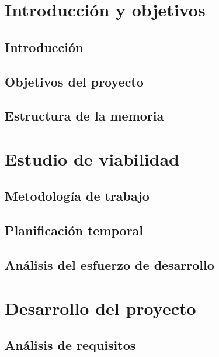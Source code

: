 
\part{Introducción y objetivos}

\chapter{Introducción}

\chapter{Objetivos del proyecto}

\chapter{Estructura de la memoria}

\part{Estudio de viabilidad}

\chapter{Metodología de trabajo}

\chapter{Planificación temporal}

\chapter{Análisis del esfuerzo de desarrollo}

\part{Desarrollo del proyecto}

\chapter{Análisis de requisitos}

\resizebox{0.5\textwidth}{!}{}

